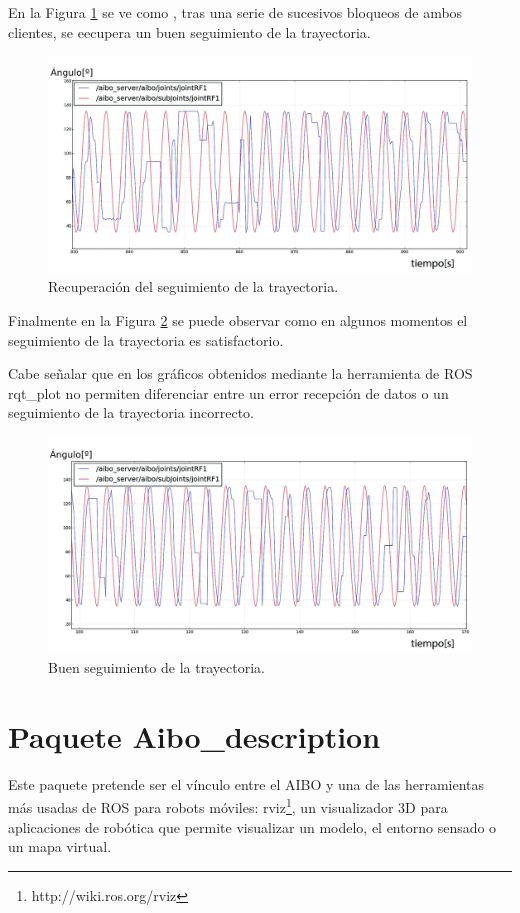 \documentclass[12pt,a4paper,final,twoside]{book}
\begin{document}
En la Figura \ref{fig:ASrecupera} se ve como , tras una serie de sucesivos bloqueos de ambos clientes, se eecupera un buen seguimiento de la trayectoria.
 
\begin{figure}[H]
	\centering
    \includegraphics[scale=0.26]{images/recupera.jpg}
 	\caption{Recuperación del seguimiento de la trayectoria.}
  \label{fig:ASrecupera}
\end{figure}

Finalmente en la Figura \ref{fig:ASbuena} se puede observar como en algunos momentos el seguimiento de la trayectoria es satisfactorio. 

Cabe señalar que en los gráficos obtenidos mediante la herramienta de ROS rqt{\_}plot no permiten diferenciar entre un error recepción de datos o un seguimiento de la trayectoria incorrecto. 
 \begin{figure}[H]
	\centering
    \includegraphics[scale=0.26]{images/mejor5hz.jpg}
 	\caption{Buen seguimiento de la trayectoria.}
  \label{fig:ASbuena}
\end{figure}



\section{Paquete Aibo{\_}description }
Este paquete pretende ser el vínculo entre el AIBO y una de las herramientas más usadas de ROS para robots móviles: rviz\footnote{http://wiki.ros.org/rviz}, un visualizador 3D para aplicaciones de robótica que permite visualizar un modelo, el entorno sensado o un mapa virtual. 
\end{document}
